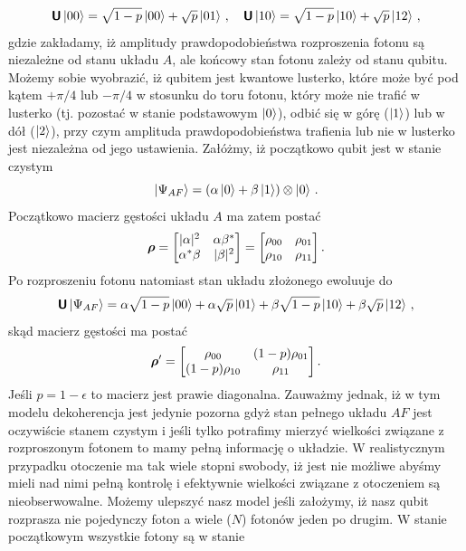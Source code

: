 \documentclass{myclass}
\begin{document}
\begin{equation*}
    \boldsymbol{\mathsf{U}}\ket{00} = \sqrt{1-p}\ket{00} + \sqrt{p}\ket{01}\,,\quad \boldsymbol{\mathsf{U}}\ket{10} = \sqrt{1-p}\ket{10} + \sqrt{p}\ket{12}\,,
\end{equation*}
gdzie zakładamy, iż amplitudy prawdopodobieństwa rozproszenia fotonu są niezależne od stanu układu
\(A\), ale końcowy stan fotonu zależy od stanu qubitu. Możemy sobie wyobrazić, iż qubitem jest
kwantowe lusterko, które może być pod kątem \(+\pi/4\) lub \(-\pi/4\) w stosunku do toru fotonu,
który może nie trafić w lusterko (tj. pozostać w stanie podstawowym \(\ket{0}\)), odbić się w górę
(\(\ket{1}\)) lub w dół (\(\ket{2}\)), przy czym amplituda prawdopodobieństwa trafienia lub nie w
lusterko jest niezależna od jego ustawienia. Załóżmy, iż początkowo qubit jest w stanie czystym
\begin{equation*}
    \ket{\Psi_{AF}} = (\alpha\ket{0} + \beta\ket{1}) \otimes \ket{0}\,.
\end{equation*}
Początkowo macierz gęstości układu \(A\) ma zatem postać
\begin{equation*}
    \oper{\rho} = \mqty[|\alpha|^2 & \alpha\beta^* \\ \alpha^*\beta & |\beta|^2] = \mqty[\rho_{00} & \rho_{01} \\ \rho_{10} & \rho_{11}]\,.
\end{equation*}
Po rozproszeniu fotonu natomiast stan układu złożonego ewoluuje do
\begin{equation*}
    \boldsymbol{\mathsf{U}}\ket{\Psi_{AF}} = \alpha\sqrt{1-p}\ket{00} + \alpha\sqrt{p}\ket{01} + \beta\sqrt{1-p}\ket{10} + \beta\sqrt{p}\ket{12}\,,
\end{equation*}
skąd macierz gęstości ma postać
\begin{equation*}
    \oper{\rho}' = \mqty[\rho_{00} & (1-p)\rho_{01} \\ (1-p)\rho_{10} & \rho_{11}]\,.
\end{equation*}
Jeśli \(p = 1 - \epsilon\) to macierz jest prawie diagonalna. Zauważmy jednak, iż w tym modelu
dekoherencja jest jedynie pozorna gdyż stan pełnego układu \(AF\) jest oczywiście stanem czystym i
jeśli tylko potrafimy mierzyć wielkości związane z rozproszonym fotonem to mamy pełną informację o
układzie. W realistycznym przypadku otoczenie ma tak wiele stopni swobody, iż jest nie możliwe
abyśmy mieli nad nimi pełną kontrolę i efektywnie wielkości związane z otoczeniem są
nieobserwowalne. Możemy ulepszyć nasz model jeśli założymy, iż nasz qubit rozprasza nie pojedynczy
foton a wiele (\(N\)) fotonów jeden po drugim. W stanie początkowym wszystkie fotony są w stanie
\end{document}
